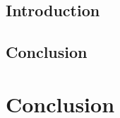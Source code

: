 \documentclass[12pt, a4paper]{article}
\begin{document}
\subsection*{Introduction}

\subsection*{Conclusion}


\newpage
\section*{Conclusion}
\end{document}
